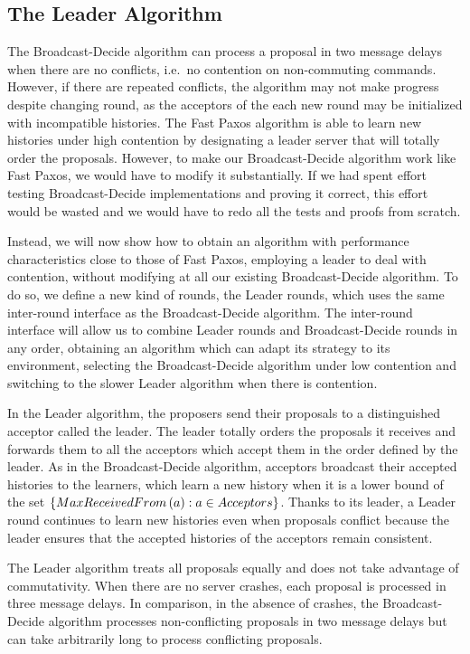 \documentclass{llncs}
\begin{document}
\subsection{The Leader Algorithm} 
\label{sec:leader}

The Broadcast-Decide algorithm can process a proposal in two message delays when there are no conflicts, i.e.\ no contention on non-commuting commands. However, if there are repeated conflicts, the algorithm may not make progress despite changing round, as the acceptors of the each new round
may be initialized with incompatible histories. The Fast Paxos algorithm \cite{Lamport06FastPaxos} is able to learn new histories under high contention by
designating a leader server that will totally order the proposals. However, to make our Broadcast-Decide algorithm work like Fast Paxos, we would have to modify it substantially. If we had spent effort testing Broadcast-Decide implementations and proving it correct, this effort would be wasted and we would have to redo all the tests and proofs from scratch.

Instead, we will now show how to obtain an algorithm with performance characteristics close to those of Fast Paxos, employing a leader to deal with contention, without modifying at all our existing Broadcast-Decide algorithm.
To do so, we define a new kind of rounds, the Leader rounds, which uses the same inter-round interface as the Broadcast-Decide algorithm. 
The inter-round interface will allow us to combine Leader rounds and Broadcast-Decide rounds in any order, obtaining an algorithm which can adapt its strategy to its environment, selecting the Broadcast-Decide algorithm under low contention and switching to the slower Leader algorithm when there is contention.

In the Leader algorithm, the proposers send their proposals to a distinguished acceptor called the leader. 
The leader totally orders the proposals it receives and forwards them to all the acceptors which accept them in the order defined by the leader.
As in the Broadcast-Decide algorithm, acceptors broadcast their accepted histories to the learners, which learn a new history when it is a lower bound of 
the set $\left\{MaxReceivedFrom\left( a \right) : a \in Acceptors\right\}$.
Thanks to its leader, a Leader round continues to learn new histories even when proposals conflict because the leader ensures that the accepted histories of the acceptors remain consistent. 

The Leader algorithm treats all proposals equally and does not take advantage of commutativity. When there are no server crashes, each proposal is processed in three message delays. In comparison, in the absence of crashes, the Broadcast-Decide algorithm processes non-conflicting proposals in two message delays but can take arbitrarily long to process conflicting proposals.
\end{document}
